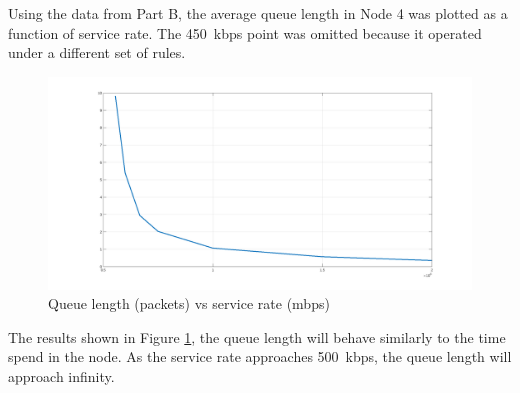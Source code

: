 \documentclass[12pt,letterpaper]{article}
\begin{document}
Using the data from Part B, the average queue length in Node 4 was plotted as a function
of service rate. The \SI{450}{kbps} point was omitted because it operated under a
different set of rules.

\begin{figure}[h!]
  \centering
  \includegraphics[width = 5in]{mean_length}
  \caption{Queue length (packets) vs service rate (mbps)}
  \label{fig:ql}
\end{figure}

The results shown in Figure \ref{fig:ql}, the queue length will behave similarly to
the time spend in the node. As the service rate approaches \SI{500}{kbps}, the queue
length will approach infinity.
\end{document}
